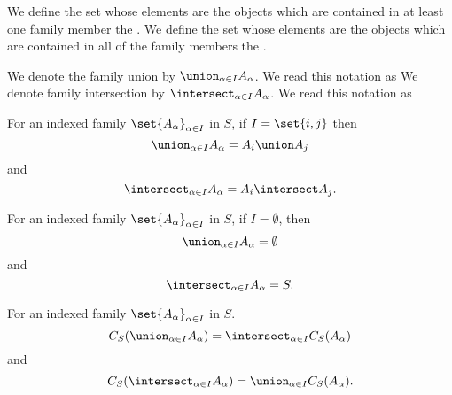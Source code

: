 We define the set whose elements are the objects
which are contained in at least one family member
the .
We define the set whose elements are the objects
which are contained in all of the family members
the .


We denote the family union by $\union_{\alpha \in I} A_{\alpha}$.
We read this notation as 
We denote family intersection by $\intersect_{\alpha \in I} A_{\alpha}$.
We read this notation as 


\begin{prop}
  For an indexed family $\set{A_{\alpha}}_{\alpha \in I}$ in $S$, if $I = \set{i, j}$ then
  \[
    \union_{\alpha \in I} A_{\alpha} = A_i \union A_j
  \]
  and
  \[
    \intersect_{\alpha \in I} A_{\alpha} = A_i \intersect A_j.
  \]
\end{prop}

\begin{prop}
  For an indexed family $\set{A_{\alpha}}_{\alpha \in I}$ in $S$, if $I = \emptyset$, then
  \[
    \union_{\alpha \in I} A_{\alpha} = \emptyset
  \]
  and
  \[
    \intersect_{\alpha \in I} A_{\alpha} = S.
  \]
\end{prop}

\begin{prop}
  For an indexed family $\set{A_{\alpha}}_{\alpha \in I}$ in $S$.
  \[
    C_S(\union_{\alpha \in I} A_{\alpha}) = \intersect_{\alpha \in I} C_S(A_{\alpha})
  \]
  and
  \[
    C_S(\intersect_{\alpha \in I} A_{\alpha}) = \union_{\alpha \in I} C_S(A_{\alpha}).
  \]
\end{prop}

\strats
